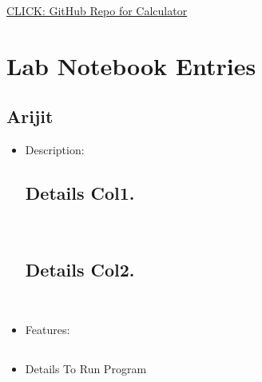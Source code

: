 \documentclass{article}
\begin{document}
\href{https://github.com/joyosmita/calculator}{CLICK: GitHub Repo for Calculator}


\newpage
\newpage
\section*{Lab Notebook Entries}
\subsection*{Arijit}
\begin{itemize}
    \subsection*{Program Name}


    \item Description: 
    
    \subsection*{Details Col1.}\\

    \subsection*{Details Col2.}\\

    \item Features: 
    \subsection*{}
    \subsection*{}
    \subsection*{}
    \subsection*{}

\item Details To Run Program 

\subsection*{}\\

\subsection*{}\\

\subsection*{}\\

\end{itemize}
\end{document}
